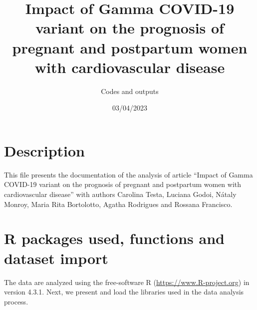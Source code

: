 \documentclass[
]{article}
\title{Impact of Gamma COVID-19 variant on the prognosis of pregnant and
postpartum women with cardiovascular disease}
\subtitle{Codes and outputs}
\author{}
\date{\vspace{-2.5em}03/04/2023}
\begin{document}
\maketitle

\hypertarget{description}{%
\section{Description}\label{description}}

This file presents the documentation of the analysis of article ``Impact
of Gamma COVID-19 variant on the prognosis of pregnant and postpartum
women with cardiovascular disease'' with authors Carolina Testa, Luciana
Godoi, Nátaly Monroy, Maria Rita Bortolotto, Agatha Rodrigues and
Rossana Francisco.

\hypertarget{r-packages-used-functions-and-dataset-import}{%
\section{R packages used, functions and dataset
import}\label{r-packages-used-functions-and-dataset-import}}

The data are analyzed using the free-software R
(\url{https://www.R-project.org}) in version 4.3.1. Next, we present and
load the libraries used in the data analysis process.
\end{document}
